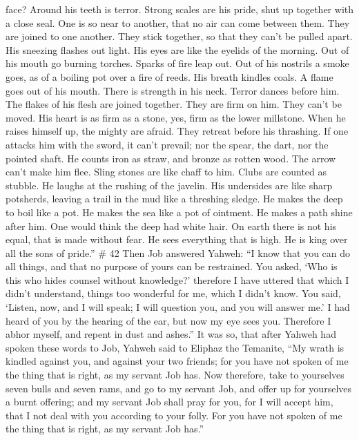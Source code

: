 face? Around his teeth is terror.  Strong scales are his
pride, shut up together with a close seal.  One is so near
to another, that no air can come between them.  They are
joined to one another. They stick together, so that they can't be pulled
apart.  His sneezing flashes out light. His eyes are like
the eyelids of the morning.  Out of his mouth go burning
torches. Sparks of fire leap out.  Out of his nostrils a
smoke goes, as of a boiling pot over a fire of reeds.  His
breath kindles coals. A flame goes out of his mouth.  There
is strength in his neck. Terror dances before him.  The
flakes of his flesh are joined together. They are firm on him. They
can't be moved.  His heart is as firm as a stone, yes, firm
as the lower millstone.  When he raises himself up, the
mighty are afraid. They retreat before his thrashing.  If
one attacks him with the sword, it can't prevail; nor the spear, the
dart, nor the pointed shaft.  He counts iron as straw, and
bronze as rotten wood.  The arrow can't make him flee.
Sling stones are like chaff to him.  Clubs are counted as
stubble. He laughs at the rushing of the javelin.  His
undersides are like sharp potsherds, leaving a trail in the mud like a
threshing sledge.  He makes the deep to boil like a pot. He
makes the sea like a pot of ointment.  He makes a path
shine after him. One would think the deep had white hair. 
On earth there is not his equal, that is made without fear.
 He sees everything that is high. He is king over all the
sons of pride.'' \# 42  Then Job answered Yahweh:
 ``I know that you can do all things, and that no purpose of
yours can be restrained.  You asked, `Who is this who hides
counsel without knowledge?' therefore I have uttered that which I didn't
understand, things too wonderful for me, which I didn't know.
 You said, `Listen, now, and I will speak; I will question
you, and you will answer me.'  I had heard of you by the
hearing of the ear, but now my eye sees you.  Therefore I
abhor myself, and repent in dust and ashes.''  It was so,
that after Yahweh had spoken these words to Job, Yahweh said to Eliphaz
the Temanite, ``My wrath is kindled against you, and against your two
friends; for you have not spoken of me the thing that is right, as my
servant Job has.  Now therefore, take to yourselves seven
bulls and seven rams, and go to my servant Job, and offer up for
yourselves a burnt offering; and my servant Job shall pray for you, for
I will accept him, that I not deal with you according to your folly. For
you have not spoken of me the thing that is right, as my servant Job
has.''

